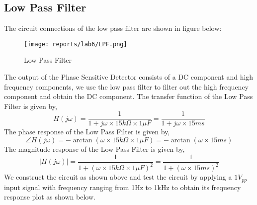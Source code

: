 \documentclass[12pt]{article}
\begin{document}
    \subsection{Low Pass Filter}
        The circuit connections of the low pass filter are shown in figure below:
        \begin{figure}[H]
            \centering
            \texttt{[image: reports/lab6/LPF.png]}
            \caption{Low Pass Filter}
        \end{figure}
        \noindent
        The output of the Phase Sensitive Detector consists of a DC component and high frequency components, we use the low pass filter to filter out the high frequency component and obtain the DC component.
        The transfer function of the Low Pass Filter is given by,
        \begin{equation}
            H(j\omega)=\frac{1}{1+j\omega \times 15k\Omega \times 1\mu F}=\frac{1}{1+j\omega \times 15ms}
        \end{equation}
        \noindent
        The phase response of the Low Pass Filter is given by,
        \begin{equation}
            \angle H(j\omega)=-\arctan(\omega \times 15k\Omega \times 1\mu F)=-\arctan(\omega \times 15ms)
        \end{equation}
        \noindent
        The magnitude response of the Low Pass Filter is given by,
        \begin{equation}
            |H(j\omega)|=\frac{1}{1+(\omega \times 15k\Omega \times 1\mu F)^2}=\frac{1}{1+(\omega \times 15ms)^2}
        \end{equation}
        \noindent
        We construct the circuit as shown above and test the circuit by applying a \(1V_{pp}\) input signal with frequency ranging from 1Hz to 1kHz to obtain its frequency response plot as shown below.
        
\end{document}
